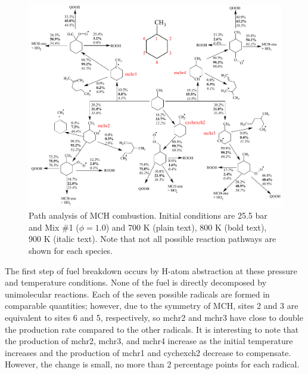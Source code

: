 \documentclass[12pt, letterpaper]{article}
\begin{document}
\begin{figure}
    \centering
    \includegraphics[width=\textwidth]{../figures/05-MCH/mch-path}
    \caption{Path analysis of MCH combustion. Initial conditions are 25.5 bar 
    and Mix \#1 ($\phi=1.0$) and 700 K (plain text), 800 K (bold text), 900 K 
    (italic text). Note that not all possible reaction pathways are shown for 
    each species.}
    \label{fig:mch-path}
\end{figure}

The first step of fuel breakdown occurs by H-atom abstraction at these pressure 
and temperature conditions. None of the fuel is directly decomposed by 
unimolecular reactions. Each of the seven possible radicals are formed in 
comparable quantities; however, due to the symmetry of MCH, sites 2 and 3 are 
equivalent to sites 6 and 5, respectively, so mchr2 and mchr3 have close to 
double the production rate compared to the other radicals. It is interesting to 
note that the production of mchr2, mchr3, and mchr4 increase as the initial 
temperature increases and the production of mchr1 and cychexch2 decrease to 
compensate. However, the change is small, no more than 2 percentage points for 
each radical.
\end{document}
